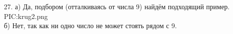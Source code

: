 27. а) Да, подбором (отталкиваясь от числа 9) найдём подходящий пример.
{{PIC:krug2.png}}\\
б) Нет, так как ни одно число не может стоять рядом с 9.\\
